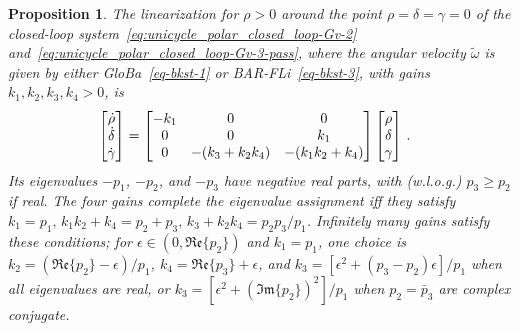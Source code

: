 \documentclass[journal,twoside,web]{ieeecolor}
\theoremstyle{definition}
\newtheorem{proposition}{Proposition}
\begin{document}
\begin{proposition} \em
\label{prop:linearization_CLF_backstepping_based}
The linearization for $\rho > 0$ around the point $\rho =\delta = \gamma = 0$  of the closed-loop system~\eqref{eq:unicycle_polar_closed_loop-Gv-2} and~\eqref{eq:unicycle_polar_closed_loop-Gv-3-pass}, where the angular velocity  \(\tilde{\omega}\) is given by either  GloBa~\eqref{eq-bkst-1} or BAR-FLi~\eqref{eq-bkst-3},
with gains $k_1, k_2, k_3,k_4 > 0$, is 
\begin{equation}
\label{eq:unicycle_polar_closed_loop-l-back}
\hspace*{-0.25cm}
\begin{bmatrix}
\dot{\rho}  \\
\dot{\delta} \\ 
\dot{\gamma} 
\end{bmatrix} = 
\begin{bmatrix}
-k_1 &0 &0 \\
0 &0 &k_1 \\
0 &-(k_3 + k_2 k_4) &-(k_1 k_2 + k_4) 
\end{bmatrix} \begin{bmatrix}
\rho \\ \delta \\ \gamma
\end{bmatrix}\,.
\end{equation}
Its eigenvalues $-p_1$, $-p_2$, and $-p_3$ have negative real parts, with (w.l.o.g.) $p_3 \ge p_2$ if real. The four gains complete the eigenvalue assignment iff they 
satisfy 
$k_1 = p_1 ,\, 
k_1k_2 + k_4 = p_2 + p_3,\,
k_3 + k_2 k_4  = {p_2 p_3}/{p_1}$.
Infinitely many gains satisfy these conditions; for $\epsilon\in(0,\mathfrak{Re}\{p_2\})$ and $k_1=p_1$, one choice is
$k_2=(\mathfrak{Re}\{p_2\}-\epsilon)/p_1$, $k_4=\mathfrak{Re}\{p_3\}+\epsilon$, and
$k_3=[\epsilon^2+(p_3-p_2)\epsilon]/p_1$ when all eigenvalues are real, or $k_3=[\epsilon^2+(\mathfrak{Im}\{p_2\})^2]/p_1$ when $p_2=\bar p_3$ are complex conjugate.
\end{proposition}
\end{document}

